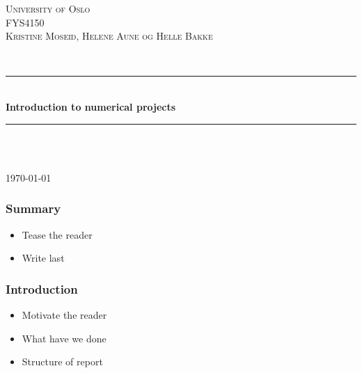 \documentclass[12pt]{article}
\begin{document}
\begin{titlepage}

\newcommand{\HRule}{\rule{\linewidth}{0.5mm}}
\center

\textsc{\LARGE University of Oslo}\\[1.5cm]
\textsc{\Large FYS4150}\\[0.5cm]
\textsc{\large Kristine Moseid, Helene Aune og Helle Bakke}\\[0.5cm]

\begin{minipage}{0.4\textwidth}
\end{minipage}\\[1cm]

\HRule \\[0.4cm]
{ \huge \bfseries Introduction to numerical projects}\\[0.4cm]
\HRule \\[1.5cm]

\begin{minipage}{0.4\textwidth}
\end{minipage}\\[8cm]


{\large \today}\\[3cm]
\vfill

\end{titlepage}

\newpage
\tableofcontents

\newpage

\subsubsection*{Summary}

\begin{itemize}
\item Tease the reader
\item Write last
\end{itemize}

\subsubsection*{Introduction}

\begin{itemize}
\item Motivate the reader
\item What have we done
\item Structure of report
\end{itemize}
\end{document}

